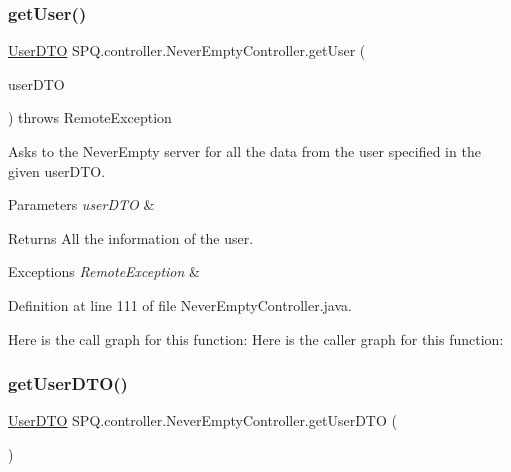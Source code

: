 \subsubsection{\texorpdfstring{get\+User()}{getUser()}}
{\footnotesize\ttfamily \mbox{\hyperlink{class_s_p_q_1_1dto_1_1_user_d_t_o}{User\+D\+TO}} S\+P\+Q.\+controller.\+Never\+Empty\+Controller.\+get\+User (\begin{DoxyParamCaption}\item[{\mbox{\hyperlink{class_s_p_q_1_1dto_1_1_user_d_t_o}{User\+D\+TO}}}]{user\+D\+TO }\end{DoxyParamCaption}) throws Remote\+Exception}

Asks to the Never\+Empty server for all the data from the user specified in the given user\+D\+TO. 
\begin{DoxyParams}{Parameters}
{\em user\+D\+TO} & \\
\hline
\end{DoxyParams}
\begin{DoxyReturn}{Returns}
All the information of the user. 
\end{DoxyReturn}

\begin{DoxyExceptions}{Exceptions}
{\em Remote\+Exception} & \\
\hline
\end{DoxyExceptions}


Definition at line 111 of file Never\+Empty\+Controller.\+java.

Here is the call graph for this function\+:
Here is the caller graph for this function\+:
\mbox{\label{class_s_p_q_1_1controller_1_1_never_empty_controller_ac6b9878caf6a1f22117adf18c5ca56b5}} 
\subsubsection{\texorpdfstring{get\+User\+D\+T\+O()}{getUserDTO()}}
{\footnotesize\ttfamily \mbox{\hyperlink{class_s_p_q_1_1dto_1_1_user_d_t_o}{User\+D\+TO}} S\+P\+Q.\+controller.\+Never\+Empty\+Controller.\+get\+User\+D\+TO (\begin{DoxyParamCaption}{ }\end{DoxyParamCaption})}

